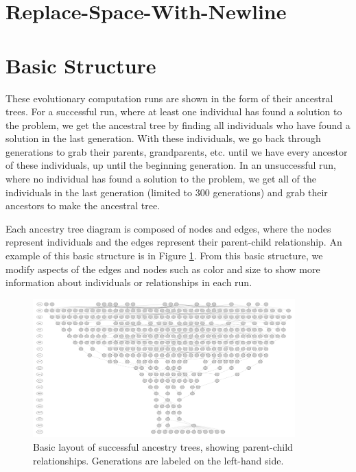 \documentclass{sig-alternate}
\begin{document}
\section{Replace-Space-With-Newline}
\label{sec:RSWN}

\section{Basic Structure}
\label{sec:basics}
These evolutionary computation runs are shown in the form of their ancestral trees. For a successful run, where at least one individual has found a solution to the problem, we get the ancestral tree by finding all individuals who have found a solution in the last generation. With these individuals, we go back through generations to grab their parents, grandparents, etc. until we have every ancestor of these individuals, up until the beginning generation. In an unsuccessful run, where no individual has found a solution to the problem, we get all of the individuals in the last generation (limited to 300 generations) and grab their ancestors to make the ancestral tree. 

Each ancestry tree diagram is composed of nodes and edges, where the nodes represent individuals and the edges represent their parent-child relationship. An example of this basic structure is in Figure \ref{fig:lexRun0Basic}. From this basic structure, we modify aspects of the edges and nodes such as color and size to show more information about individuals or relationships in each run.

\begin{figure}
	\begin{center}
		\includegraphics[width=0.9\textwidth]{../Figures/run0_basic_structure.pdf}
	\end{center}
	\caption{Basic layout of successful ancestry trees, showing parent-child relationships. Generations are labeled on the left-hand side.}
	\label{fig:lexRun0Basic}
\end{figure}
\end{document}

